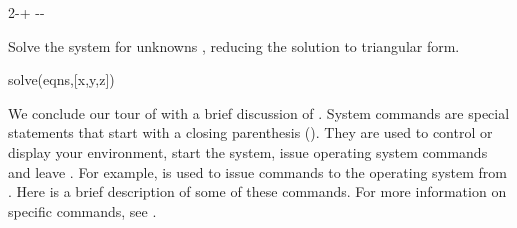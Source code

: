 {{{{{{{{\begin{xtc}
\begin{TeXOutput}
\begin{fricasmath}{5}
{{{}}{2}\TIMES {}-{\TIMES {}}+%
\COMMA {}\TIMES {}-{\TIMES {}}-{%
}}%
\end{fricasmath}
\end{TeXOutput}
\end{xtc}
\begin{xtc}
\begin{xtccomment}
Solve the system for unknowns \smath{[x,y,z]},
reducing the solution to triangular form.
\end{xtccomment}
\begin{spadsrc}
solve(eqns,[x,y,z])
\end{spadsrc}
\begin{TeXOutput}
\begin{fricasmath}{6}
%
\end{fricasmath}
\end{TeXOutput}
\end{xtc}
%

We conclude our tour of \Language{} with a brief discussion
of .
System commands are special statements that start with a
closing parenthesis (\spadSyntax{)}). They are used to control or
display your \Language{} environment, start the \HyperName{}
system, issue operating system commands and leave \Language{}.
For example,  is used
to issue commands to the operating system from \Language{}.
Here is a brief description of some of these commands.
For more information on specific commands, see
.

}}}}}}}}
